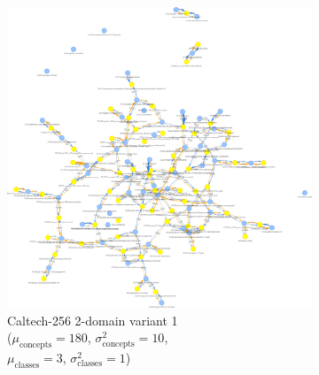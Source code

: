 \begin{figure}[H]
      \centering
      \begin{subfigure}[b]{0.35\textwidth}
            \centering
            \includegraphics[width=\textwidth]{figures/caltech256_2domain.png}
            \caption{Caltech-256 2-domain variant 1\\
            ($\mu_{\text{concepts}}=180$, $\sigma^2_{\text{concepts}}=10$,\\
            $\mu_{\text{classes}}=3$, $\sigma^2_{\text{classes}}=1$)}
            \label{fig:caltech256_2domain}
      \end{subfigure}
      \hfill
      \begin{subfigure}[b]{0.35\textwidth}
            \centering

\end{subfigure}
\end{figure}

